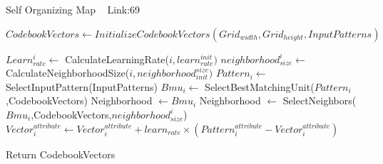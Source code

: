 \documentclass[a4paper]{article}
\begin{document}
  \begin{algorithm}
   \caption{Self Organizing Map ~\cite{som3} Link:69 }
    \begin{algorithmic}[1]
     \State $CodebookVectors \leftarrow InitializeCodebookVectors(Grid_{width},Grid_{height},InputPatterns) $
     
    
            \State $Learn_{rate}^i \leftarrow$ CalculateLearningRate($i,learn_{rate}^{init})$
            \State $neighborhood_{size}^i \leftarrow$ CalculateNeighborhoodSize($i,neighborhood_{init}^{size})$
            \State $Pattern_i \leftarrow$ SelectInputPattern(InputPatterns)
             \State $Bmu_i \leftarrow$ SelectBestMatchingUnit($Pattern_i$,CodebookVectors)
             \State Neighborhood $\leftarrow Bmu_i$
              \State Neighborhood $\leftarrow$  SelectNeighbors($Bmu_i$,CodebookVectors,$neighborhood_{size}^i$)
            \State $Vector_i^{attribute} \leftarrow Vector_i^{attribute} + learn_{rate} \times (Pattern_i ^{attribute} - Vector_i ^{attribute})  $
            \EndFor
          
            
            \EndFor
           
        \EndFor
        
       
       \State Return CodebookVectors



 

\end{algorithmic}
\end{algorithm}
\end{document}
